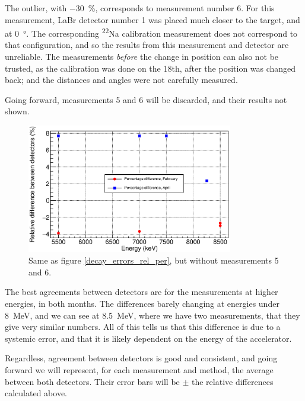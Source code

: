 \documentclass[a4paper,12pt]{report}
\newcommand{\Na}{\textsuperscript{22}Na }
\begin{document}
The outlier, with \qty{-30}{\percent}, corresponds to measurement number 6.
For this measurement, LaBr detector number 1 was placed much closer to the target, and at \qty{0}{\degree}.
The corresponding \Na calibration measurement does not correspond to that configuration, and so the results from this measurement and detector are unreliable.
The measurements \emph{before} the change in position can also not be trusted, as the calibration was done on the 18th, after the position was changed back; and the distances and angles were not carefully measured.

Going forward, measurements 5 and 6 will be discarded, and their results not shown.
\\

\begin{figure}[H]
	\centering
	\includegraphics[width=0.80\textwidth]{decay_errors_rel_per_fixed.eps}
	\caption{Same as figure \ref{decay_errors_rel_per}, but without measurements 5 and 6.}
	\label{decay_errors_rel_per_fixed}
\end{figure}

The best agreements between detectors are for the measurements at higher energies, in both months.
The differences barely changing at energies under \qty{8}{\MeV}, and we can see at \qty{8.5}{\MeV}, where we have two measurements, that they give very similar numbers.
All of this tells us that this difference is due to a systemic error, and that it is likely dependent on the energy of the accelerator.

Regardless, agreement between detectors is good and consistent, and going forward we will represent, for each measurement and method, the average between both detectors.
Their error bars will be $\pm$ the relative differences calculated above.
\end{document}
